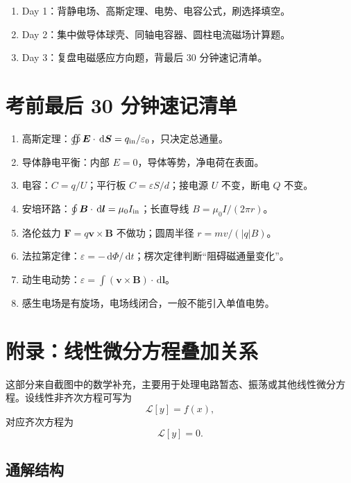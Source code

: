\documentclass[UTF8,zihao=-4]{ctexart}
\newcommand{\dd}{\,\mathrm d}
\newcommand{\ve}[1]{\bm{#1}}
\begin{document}
\begin{methodbox}[3 天版]
\begin{enumerate}
  \item Day 1：背静电场、高斯定理、电势、电容公式，刷选择填空。
  \item Day 2：集中做导体球壳、同轴电容器、圆柱电流磁场计算题。
  \item Day 3：复盘电磁感应方向题，背最后 30 分钟速记清单。
\end{enumerate}
\end{methodbox}

\section{考前最后 30 分钟速记清单}
\begin{keybox}[只看这些]
\begin{enumerate}
  \item 高斯定理：$\oiint \ve E\cdot \dd\ve S=q_{\rm in}/\varepsilon_0$，只决定总通量。
  \item 导体静电平衡：内部 $E=0$，导体等势，净电荷在表面。
  \item 电容：$C=q/U$；平行板 $C=\varepsilon S/d$；接电源 $U$ 不变，断电 $Q$ 不变。
  \item 安培环路：$\oint \ve B\cdot\dd\ve l=\mu_0 I_{\rm in}$；长直导线 $B=\mu_0I/(2\pi r)$。
  \item 洛伦兹力 $\ve F=q\ve v\times\ve B$ 不做功；圆周半径 $r=mv/(|q|B)$。
  \item 法拉第定律：$\varepsilon=-\dd\Phi/\dd t$；楞次定律判断“阻碍磁通量变化”。
  \item 动生电动势：$\varepsilon=\int(\ve v\times\ve B)\cdot\dd\ve l$。
  \item 感生电场是有旋场，电场线闭合，一般不能引入单值电势。
\end{enumerate}
\end{keybox}

\section{附录：线性微分方程叠加关系}

这部分来自截图中的数学补充，主要用于处理电路暂态、振荡或其他线性微分方程。设线性非齐次方程可写为
\[
\mathcal L[y]=f(x),
\]
对应齐次方程为
\[
\mathcal L[y]=0.
\]

\subsection{通解结构}
\end{document}
